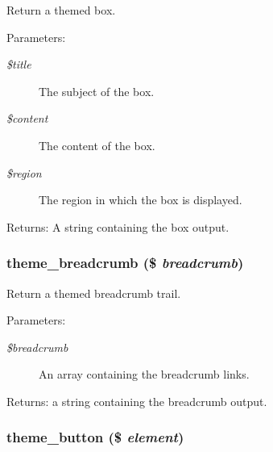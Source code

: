 Return a themed box.

\begin{Desc}
\item[Parameters:]
\begin{description}
\item[{\em \$title}]The subject of the box. \item[{\em \$content}]The content of the box. \item[{\em \$region}]The region in which the box is displayed. \end{description}
\end{Desc}
\begin{Desc}
\item[Returns:]A string containing the box output. \end{Desc}
\hypertarget{group__themeable_g499898a137ccb56620058a9ad884363a}{
\subsubsection[{theme\_\-breadcrumb}]{\setlength{\rightskip}{0pt plus 5cm}theme\_\-breadcrumb (\$ {\em breadcrumb})}}
\label{group__themeable_g499898a137ccb56620058a9ad884363a}


Return a themed breadcrumb trail.

\begin{Desc}
\item[Parameters:]
\begin{description}
\item[{\em \$breadcrumb}]An array containing the breadcrumb links. \end{description}
\end{Desc}
\begin{Desc}
\item[Returns:]a string containing the breadcrumb output. \end{Desc}
\hypertarget{group__themeable_g8c060aea7d7b974f4c61eb1ee9a5feb8}{
\subsubsection[{theme\_\-button}]{\setlength{\rightskip}{0pt plus 5cm}theme\_\-button (\$ {\em element})}}
\label{group__themeable_g8c060aea7d7b974f4c61eb1ee9a5feb8}


